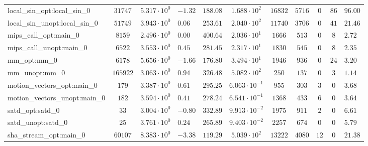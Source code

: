 \begin{tabular}{|l|c|HHc|c|c|c|c|cH|}
local\_sin\_opt:local\_sin\_0                   & $ 31747    $ & $ 5.317 \cdot 10^{0} $ & $ -1.32 $ & $ 188.08 $ & $ 1.688 \cdot 10^{2}  $ & $ 16832  $ & $ 5716  $ & $ 0   $ & $ 86  $ & $ 96.00   $ \\
local\_sin\_unopt:local\_sin\_0                 & $ 51749    $ & $ 3.943 \cdot 10^{0} $ & $ 0.06  $ & $ 253.61 $ & $ 2.040 \cdot 10^{2}  $ & $ 11740  $ & $ 3706  $ & $ 0   $ & $ 41  $ & $ 21.46   $ \\
mips\_call\_opt:main\_0                         & $ 8159     $ & $ 2.496 \cdot 10^{0} $ & $ 0.00  $ & $ 400.64 $ & $ 2.036 \cdot 10^{1}  $ & $ 1666   $ & $ 513   $ & $ 0   $ & $ 8   $ & $ 2.72    $ \\
mips\_call\_unopt:main\_0                       & $ 6522     $ & $ 3.553 \cdot 10^{0} $ & $ 0.45  $ & $ 281.45 $ & $ 2.317 \cdot 10^{1}  $ & $ 1830   $ & $ 545   $ & $ 0   $ & $ 8   $ & $ 2.35    $ \\
mm\_opt:mm\_0                                   & $ 6178     $ & $ 5.656 \cdot 10^{0} $ & $ -1.66 $ & $ 176.80 $ & $ 3.494 \cdot 10^{1}  $ & $ 1946   $ & $ 936   $ & $ 0   $ & $ 24  $ & $ 3.20    $ \\
mm\_unopt:mm\_0                                 & $ 165922   $ & $ 3.063 \cdot 10^{0} $ & $ 0.94  $ & $ 326.48 $ & $ 5.082 \cdot 10^{2}  $ & $ 250    $ & $ 137   $ & $ 0   $ & $ 3   $ & $ 1.14    $ \\
motion\_vectors\_opt:main\_0                    & $ 179      $ & $ 3.387 \cdot 10^{0} $ & $ 0.61  $ & $ 295.25 $ & $ 6.063 \cdot 10^{-1} $ & $ 955    $ & $ 303   $ & $ 3   $ & $ 0   $ & $ 3.68    $ \\
motion\_vectors\_unopt:main\_0                  & $ 182      $ & $ 3.594 \cdot 10^{0} $ & $ 0.41  $ & $ 278.24 $ & $ 6.541 \cdot 10^{-1} $ & $ 1368   $ & $ 433   $ & $ 6   $ & $ 0   $ & $ 3.64    $ \\
satd\_opt:satd\_0                               & $ 33       $ & $ 3.004 \cdot 10^{0} $ & $ -0.80 $ & $ 332.89 $ & $ 9.913 \cdot 10^{-2} $ & $ 1975   $ & $ 911   $ & $ 2   $ & $ 0   $ & $ 6.61    $ \\
satd\_unopt:satd\_0                             & $ 25       $ & $ 3.761 \cdot 10^{0} $ & $ 0.24  $ & $ 265.89 $ & $ 9.403 \cdot 10^{-2} $ & $ 2257   $ & $ 674   $ & $ 0   $ & $ 0   $ & $ 5.79    $ \\
sha\_stream\_opt:main\_0                        & $ 60107    $ & $ 8.383 \cdot 10^{0} $ & $ -3.38 $ & $ 119.29 $ & $ 5.039 \cdot 10^{2}  $ & $ 13222  $ & $ 4080  $ & $ 12  $ & $ 0   $ & $ 21.38   $ \\

\end{tabular}
